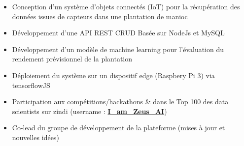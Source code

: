 \documentclass[11pt,a4paper,ragged2e, withhyper]{altacv}
\begin{document}

\begin{fullwidth}
      \makecvheader
\end{fullwidth}



\begin{itemize}
      \item{Conception d'un système d'objets connectés (IoT) pour la récupération des données issues de capteurs dans une plantation de manioc}
      \item{Développement d'une API REST CRUD Basée sur NodeJs et MySQL}
      \item{Développement d'un modèle de machine learning pour l'évaluation du rendement prévisionnel de la plantation}
      \item{Déploiement du système sur un dispositif edge (Raspbery Pi 3) via tensorflowJS}
\end{itemize}

\divider

\begin{itemize}
      \item{Participation aux compétitions/hackathons \& dans le Top 100 des data scientists sur zindi (username : \href{https://zindi.africa/users/I_am_Zeus_AI/competitions}{\textbf{I\_am\_Zeus\_AI}})}
      \item{Co-lead du groupe de développement de la plateforme (mises à jour et nouvelles idées)}
\end{itemize}
\end{document}
